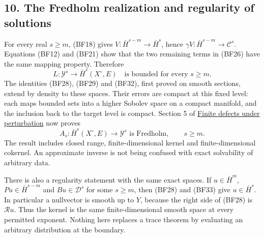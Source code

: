 \documentclass[
  11pt,
]{article}
\makeatletter
\let\ReaderOriginalAnchorStart\hyper@anchorstart
\let\ReaderOriginalAnchorEnd\hyper@anchorend
\let\ReaderPendingAliases\@empty
\def\ReaderArmAliases#1{\gdef\ReaderPendingAliases{#1}}
\def\hyper@anchorstart#1{\ReaderIfNativeAnchorTF{#1}{\ReaderPendingAliases\global\let\ReaderPendingAliases\@empty}{}\ReaderOriginalAnchorStart{#1}}
\makeatother
\begin{document}
\subsection{10. The Fredholm realization and regularity of
solutions}\label{the-fredholm-realization-and-regularity-of-solutions}

For every real \(s\geq m\), (BF18) gives \(V:\bar H^{s-m}\to\bar H^s\),
hence \(\gamma V:\bar H^{s-m}\to\mathcal C^s\). Equations (BF12) and
(BF21) show that the two remaining terms in (BF26) have the same mapping
property. Therefore \[
 L:\mathcal Y^s\longrightarrow\bar H^s(X^\circ,E)
 \quad\text{is bounded for every }s\geq m.
 \tag{BF33}
\] The identities (BF28), (BF29) and (BF32), first proved on smooth
sections, extend by density to these spaces. Their errors are compact at
this fixed level: each maps bounded sets into a higher Sobolev space on
a compact manifold, and the inclusion back to the target level is
compact. Section 5 of \href{fredholm-stability.pdf}{Finite defects under
perturbation} now proves \[
 A_s:\bar H^s(X^\circ,E)\longrightarrow\mathcal Y^s
 \text{ is Fredholm},\qquad s\geq m.
 \tag{BF34}
\] The result includes closed range, finite-dimensional kernel and
finite-dimensional cokernel. An approximate inverse is not being
confused with exact solvability of arbitrary data.

There is also a regularity statement with the same exact spaces. If
\(u\in\bar H^m\), \(Pu\in\bar H^{s-m}\) and \(Bu\in\mathcal D^s\) for
some \(s\geq m\), then (BF28) and (BF33) give \(u\in\bar H^s\). In
particular a nullvector is smooth up to \(Y\), because the right side of
(BF28) is \(\mathcal R u\). Thus the kernel is the same
finite-dimensional smooth space at every permitted exponent. Nothing
here replaces a trace theorem by evaluating an arbitrary distribution at
the boundary.

\ReaderArmAliases{\ReaderOriginalAnchorStart{AN03-GFB-011}\ReaderOriginalAnchorEnd\begingroup\expandafter\def\csname @currentHref\endcsname{AN03-GFB-011}\label{AN03-GFB-011}\endgroup\ReaderOriginalAnchorStart{an03-gfb-011-why-fredholmness-forces-the-full-symbol-condition}\ReaderOriginalAnchorEnd\begingroup\expandafter\def\csname @currentHref\endcsname{an03-gfb-011-why-fredholmness-forces-the-full-symbol-condition}\label{an03-gfb-011-why-fredholmness-forces-the-full-symbol-condition}\endgroup\ReaderOriginalAnchorStart{11-why-fredholmness-forces-the-full-symbol-condition}\ReaderOriginalAnchorEnd\begingroup\expandafter\def\csname @currentHref\endcsname{11-why-fredholmness-forces-the-full-symbol-condition}\label{11-why-fredholmness-forces-the-full-symbol-condition}\endgroup\ReaderOriginalAnchorStart{why-fredholmness-forces-the-full-symbol-condition}\ReaderOriginalAnchorEnd}
\end{document}
